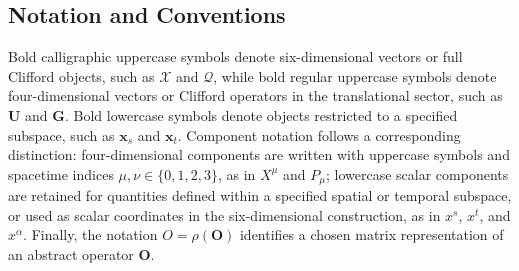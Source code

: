 \subsection*{Notation and Conventions}
Bold calligraphic uppercase symbols denote six-dimensional vectors or full Clifford objects, such as $\boldsymbol{\mathcal{X}}$ and $\boldsymbol{\mathcal{Q}}$, while bold regular uppercase symbols denote four-dimensional vectors or Clifford operators in the translational sector, such as $\mathbf{U}$ and $\mathbf{G}$. Bold lowercase symbols denote objects restricted to a specified subspace, such as $\mathbf{x}_{s}$ and $\mathbf{x}_{t}$. Component notation follows a corresponding distinction: four-dimensional components are written with uppercase symbols and spacetime indices $\mu,\nu\in\{0,1,2,3\}$, as in $X^{\mu}$ and $P_{\mu}$; lowercase scalar components are retained for quantities defined within a specified spatial or temporal subspace, or used as scalar coordinates in the six-dimensional construction, as in $x^{s}$, $x^{t}$, and $x^{\alpha}$. Finally, the notation $O=\rho(\mathbf{O})$ identifies a chosen matrix representation of an abstract operator $\mathbf{O}$.
